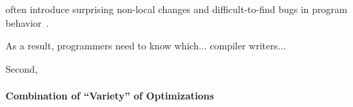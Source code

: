 often introduce surprising non-local changes and difficult-to-find bugs in program
behavior~\cite{wang2013towards,yang2011finding}.

As a result, programmers need to know which... compiler writers...

Second, 






\paragraph{Combination of ``Variety'' of Optimizations}






